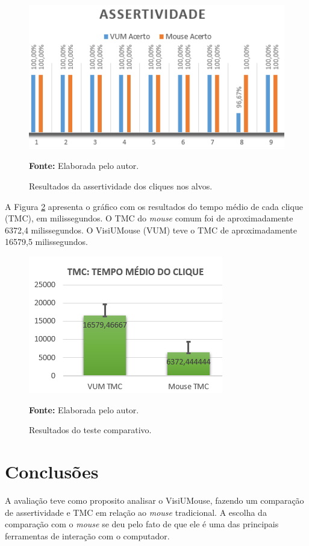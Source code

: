 \begin{figure}[H]
\caption{Resultados da assertividade dos cliques nos alvos.} 
\centering \includegraphics[scale=1]{img/assertividade.png}

{\fontsize{11}{11}\selectfont \textbf{Fonte:} Elaborada pelo autor.}
\label{fig:assertividade}
\end{figure}

A Figura \ref{fig:tmc} apresenta o gráfico com os resultados do tempo médio de cada clique (TMC), em milissegundos. O TMC do \textit{mouse} comum foi de aproximadamente 6372,4 milissegundos. O VisiUMouse (VUM) teve o TMC de aproximadamente 16579,5 milissegundos.
\begin{figure}[H]
\caption{Resultados do teste comparativo.} 
\centering \includegraphics[scale=1]{img/tmc2.png}

{\fontsize{11}{11}\selectfont \textbf{Fonte:} Elaborada pelo autor.}
\label{fig:tmc}
\end{figure}

\section{Conclusões}\label{Sub:conclusao-ex-1}

A avaliação teve como proposito analisar o VisiUMouse, fazendo um comparação de assertividade e TMC em relação ao \textit{mouse} tradicional. A escolha da comparação com o \textit{mouse} se deu pelo fato de que ele é uma das principais ferramentas de interação com o computador.

